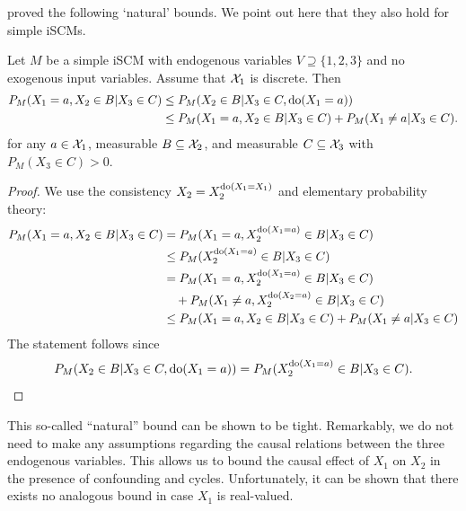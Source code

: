\cite{ManskiNagin1998} proved the following `natural' bounds. We point out here that they also hold for simple iSCMs.
\begin{Thm}\label{thm:natural_bounds}
  Let $M$ be a simple iSCM with endogenous variables $V \supseteq \{1,2,3\}$ and no exogenous input variables.
  Assume that $\mathcal{X}_1$ is discrete.
  Then
  \begin{equation}\label{eq:natural_bounds}\begin{split}
    P_M(X_1=a,X_2 \in B|X_3 \in C) &\le P_M(X_2\in B|X_3 \in C, \operatorname{do}(X_1=a)) \\
                   &\le P_M(X_1=a,X_2\in B|X_3 \in C) + P_M(X_1\ne a|X_3 \in C).
  \end{split}\end{equation}
  for any $a\in\mathcal{X}_1$, measurable $B \subseteq \mathcal{X}_2$, and measurable $C \subseteq \mathcal{X}_3$ with $P_M(X_3 \in C) > 0$.
\end{Thm}
\begin{proof}
  We use the consistency $X_2=X_2^{\operatorname{do}(X_1=X_1)}$ and elementary probability theory:
    \begin{align*}
      P_M(X_1=a,X_2\in B|X_3 \in C) 
      &= P_M(X_1=a,X_2^{\operatorname{do}(X_1=a)}\in B|X_3 \in C) \\
      &\le P_M(X_2^{\operatorname{do}(X_1=a)}\in B|X_3 \in C) \\
      &= P_M(X_1=a,X_2^{\operatorname{do}(X_1=a)}\in B|X_3 \in C) \\
      & \quad + P_M(X_1\ne a,X_2^{\operatorname{do}(X_2=a)}\in B|X_3 \in C) \\
      &\le P_M(X_1=a,X_2\in B|X_3 \in C) + P_M(X_1 \ne a|X_3 \in C)
    \end{align*}
  The statement follows since
  $$ P_M(X_2\in B|X_3 \in C, \operatorname{do}(X_1=a)) = P_M(X_2^{\operatorname{do}(X_1=a)}\in B|X_3 \in C).$$
\end{proof}
This so-called ``natural'' bound can be shown to be tight. 
Remarkably, we do not need to make any assumptions regarding the causal relations between the three endogenous variables.
This allows us to bound the causal effect of $X_1$ on $X_2$ in the presence of confounding and cycles.
Unfortunately, it can be shown that there exists no analogous bound in case $X_1$ is real-valued.

